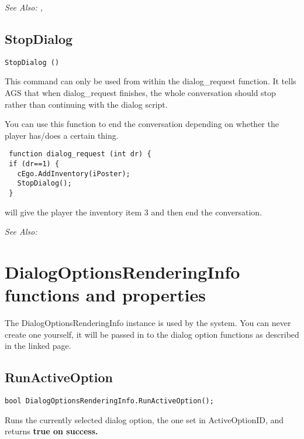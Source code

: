 \it{See Also:} ,


\subsection{StopDialog}\label{StopDialog}%

\begin{verbatim}
StopDialog ()
\end{verbatim}
This command can only be used from within the dialog_request function. It
tells AGS that when dialog_request finishes, the whole conversation should
stop rather than continuing with the dialog script.

You can use this function to end the conversation depending on whether the
player has/does a certain thing.

\begin{verbatim}
 function dialog_request (int dr) {
 if (dr==1) {
   cEgo.AddInventory(iPoster);
   StopDialog();
 }
\end{verbatim}
will give the player the inventory item 3 and then end the conversation.

\it{See Also:} 



\section{DialogOptionsRenderingInfo functions and properties}\label{DialogOptionsRenderingInfoFunctions}%

The DialogOptionsRenderingInfo instance is used by the 
system. You can never create one yourself, it will be passed in to the dialog option functions as
described in the linked page.

\subsection{RunActiveOption}\label{DialogOptionsRenderingInfo.RunActiveOption}%

\begin{verbatim}
bool DialogOptionsRenderingInfo.RunActiveOption();
\end{verbatim}
Runs the currently selected dialog option, the one set in ActiveOptionID, and returns \bf{true} on success.

